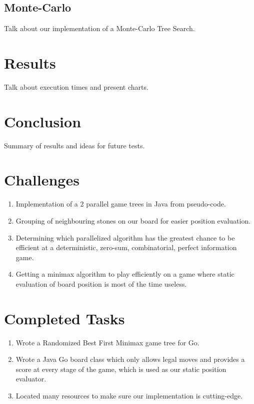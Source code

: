 \documentclass[conference]{IEEEtran}
\begin{document}
\subsection{Monte-Carlo}
Talk about our implementation of a Monte-Carlo Tree Search.

\section{Results}
Talk about execution times and present charts.

\section{Conclusion}
Summary of results and ideas for future tests.

\appendices
\section{Challenges}
\begin{enumerate}
  \item Implementation of a 2 parallel game trees in Java from pseudo-code.
  \item Grouping of neighbouring stones on our board for easier position evaluation.
  \item Determining which parallelized algorithm has the greatest chance to be efficient at a deterministic, zero-sum, combinatorial, perfect information game.
  \item Getting a minimax algorithm to play efficiently on a game where static evaluation of board position is most of the time useless.
\end{enumerate}

\section{Completed Tasks}
\begin{enumerate}
  \item Wrote a Randomized Best First Minimax game tree for Go.
  \item Wrote a Java Go board class which only allows legal moves and provides a score at every stage of the game, which is used as our static position evaluator.
  \item Located many resources to make sure our implementation is cutting-edge.
\end{enumerate}
\end{document}
